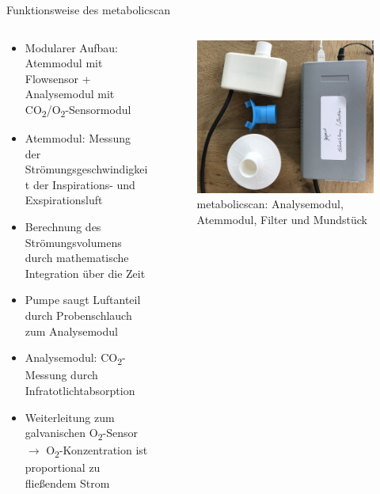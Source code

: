 \documentclass[colorBG,slideColor,8pt]{beamer}
\begin{document}
\begin{frame}{Funktionsweise des metabolicscan}
\begin{columns}
\begin{column}{0.5\linewidth}
\begin{itemize}
	\item Modularer Aufbau: Atemmodul mit Flowsensor + Analysemodul mit CO\textsubscript{2}/O\textsubscript{2}-Sensormodul
	\item Atemmodul: Messung der Strömungsgeschwindigkeit der Inspirations- und Exspirationsluft
	\item Berechnung des Strömungsvolumens durch mathematische Integration über die Zeit
	\item Pumpe saugt Luftanteil durch Probenschlauch zum Analysemodul
	\item Analysemodul: CO\textsubscript{2}-Messung durch Infratotlichtabsorption
	\item Weiterleitung zum galvanischen O\textsubscript{2}-Sensor $\rightarrow$ O\textsubscript{2}-Konzentration ist proportional zu fließendem Strom
\end{itemize}
\end{column}
\begin{column}{0.5\linewidth}
			\begin{figure}[H]
				\centering
				\includegraphics[width=0.8\linewidth]{Bilder/mbs.jpg}
				\caption{metabolicscan: Analysemodul, Atemmodul, Filter und Mundstück}
			\end{figure}
\end{column}
\end{columns}
\end{frame}
\end{document}
